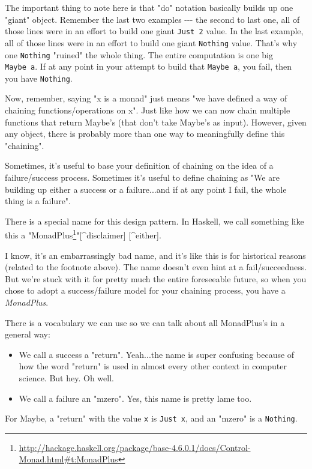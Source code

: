 \documentclass[]{article}
\renewcommand{\href}[2]{#2\footnote{\url{#1}}}
\begin{document}
The important thing to note here is that "do" notation basically builds up one
"giant" object. Remember the last two examples -\/-\/- the second to last one,
all of those lines were in an effort to build one giant \texttt{Just\ 2} value.
In the last example, all of those lines were in an effort to build one giant
\texttt{Nothing} value. That's why one \texttt{Nothing} "ruined" the whole
thing. The entire computation is one big \texttt{Maybe\ a}. If at any point in
your attempt to build that \texttt{Maybe\ a}, you fail, then you have
\texttt{Nothing}.

Now, remember, saying "x is a monad" just means "we have defined a way of
chaining functions/operations on x". Just like how we can now chain multiple
functions that return Maybe's (that don't take Maybe's as input). However, given
any object, there is probably more than one way to meaningfully define this
"chaining".

Sometimes, it's useful to base your definition of chaining on the idea of a
failure/success process. Sometimes it's useful to define chaining as "We are
building up either a success or a failure...and if at any point I fail, the
whole thing is a failure".

There is a special name for this design pattern. In Haskell, we call something
like this a
"\href{http://hackage.haskell.org/package/base-4.6.0.1/docs/Control-Monad.html\#t:MonadPlus}{MonadPlus}"{[}\^{}disclaimer{]}
{[}\^{}either{]}.

I know, it's an embarrassingly bad name, and it's like this is for historical
reasons (related to the footnote above). The name doesn't even hint at a
fail/succeedness. But we're stuck with it for pretty much the entire foreseeable
future, so when you chose to adopt a success/failure model for your chaining
process, you have a \emph{MonadPlus}.

There is a vocabulary we can use so we can talk about all MonadPlus's in a
general way:

\begin{itemize}
\tightlist
\item
  We call a success a "return". Yeah...the name is super confusing because of
  how the word "return" is used in almost every other context in computer
  science. But hey. Oh well.
\item
  We call a failure an "mzero". Yes, this name is pretty lame too.
\end{itemize}

For Maybe, a "return" with the value \texttt{x} is \texttt{Just\ x}, and an
"mzero" is a \texttt{Nothing}.
\end{document}
